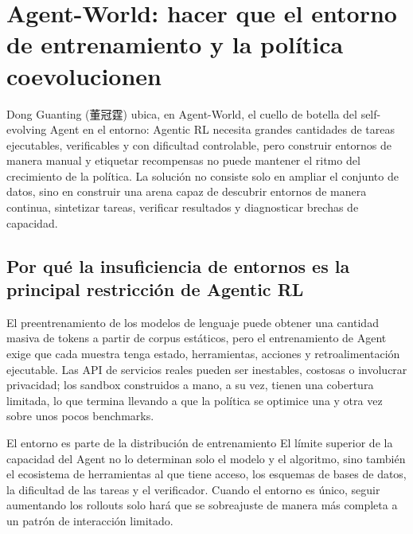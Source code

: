 \section{Agent-World: hacer que el entorno de entrenamiento y la política coevolucionen}

Dong Guanting (董冠霆) ubica, en Agent-World, el cuello de botella del self-evolving Agent en el entorno: Agentic RL necesita grandes cantidades de tareas ejecutables, verificables y con dificultad controlable, pero construir entornos de manera manual y etiquetar recompensas no puede mantener el ritmo del crecimiento de la política. La solución no consiste solo en ampliar el conjunto de datos, sino en construir una arena capaz de descubrir entornos de manera continua, sintetizar tareas, verificar resultados y diagnosticar brechas de capacidad.


\subsection{Por qué la insuficiencia de entornos es la principal restricción de Agentic RL}

El preentrenamiento de los modelos de lenguaje puede obtener una cantidad masiva de tokens a partir de corpus estáticos, pero el entrenamiento de Agent exige que cada muestra tenga estado, herramientas, acciones y retroalimentación ejecutable. Las API de servicios reales pueden ser inestables, costosas o involucrar privacidad; los sandbox construidos a mano, a su vez, tienen una cobertura limitada, lo que termina llevando a que la política se optimice una y otra vez sobre unos pocos benchmarks.


\begin{importantbox}{El entorno es parte de la distribución de entrenamiento}
El límite superior de la capacidad del Agent no lo determinan solo el modelo y el algoritmo, sino también el ecosistema de herramientas al que tiene acceso, los esquemas de bases de datos, la dificultad de las tareas y el verificador. Cuando el entorno es único, seguir aumentando los rollouts solo hará que se sobreajuste de manera más completa a un patrón de interacción limitado.
\end{importantbox}

